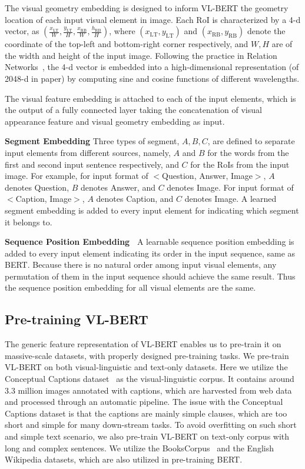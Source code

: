 The visual geometry embedding is designed to inform VL-BERT the geometry location of each input visual element in image. Each RoI is characterized by a 4-d vector, as $(\frac{x_{\text{LT}}}{W}, \frac{y_{\text{LT}}}{H}, \frac{x_{\text{RB}}}{W}, \frac{h_{\text{RB}}}{H})$, where $(x_{\text{LT}}, y_{\text{LT}})$ and $(x_{\text{RB}}, y_{\text{RB}})$ denote the coordinate of the top-left and bottom-right corner respectively, and $W, H$ are of the width and height of the input image. Following the practice in Relation Networks~\citep{hu2018relation}, the 4-d vector is embedded into a high-dimensional representation (of 2048-d in paper) by computing sine and cosine functions of different wavelengths.

The visual feature embedding is attached to each of the input elements, which is the output of a fully connected layer taking the concatenation of visual appearance feature and visual geometry embedding as input.

\textbf{Segment Embedding} Three types of segment, $A, B, C$, are defined to separate input elements from different sources, namely, $A$ and $B$ for the words from the first and second input sentence respectively, and $C$ for the RoIs from the input image. For example, for input format of $<$Question, Answer, Image$>$, $A$ denotes Question, $B$ denotes Answer, and $C$ denotes Image. For input format of $<$Caption, Image$>$, $A$ denotes Caption, and $C$ denotes Image. A learned segment embedding is added to every input element for indicating which segment it belongs to.

\textbf{Sequence Position Embedding~} A learnable sequence position embedding is added to every input element indicating its order in the input sequence, same as BERT. Because there is no natural order among input visual elements, any permutation of them in the input sequence should achieve the same result. Thus the sequence position embedding for all visual elements are the same. 

\subsection{Pre-training VL-BERT}
\label{sec:pre_training_tasks}

The generic feature representation of VL-BERT enables us to pre-train it on massive-scale datasets, with properly designed pre-training tasks. We pre-train VL-BERT on both visual-linguistic and text-only datasets. Here we utilize the Conceptual Captions dataset~\citep{sharma2018conceptual} as the visual-linguistic corpus. It contains around 3.3 million images annotated with captions, which are harvested from web data and processed through an automatic pipeline. The issue with the Conceptual Captions dataset is that the captions are mainly simple clauses, which are too short and simple for many down-stream tasks. To avoid overfitting on such short and simple text scenario, we also pre-train VL-BERT on text-only corpus with long and complex sentences. We utilize the BooksCorpus~\citep{zhu2015aligning} and the English Wikipedia datasets, which are also utilized in pre-training BERT.

